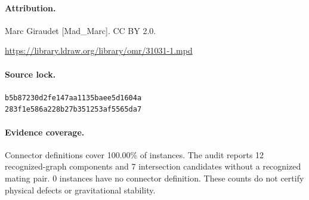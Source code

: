 \paragraph{Attribution.}Marc Giraudet [Mad\_Marc]. CC BY 2.0.\par\noindent\url{https://library.ldraw.org/library/omr/31031-1.mpd}
\paragraph{Source lock.}\small\texttt{b5b87230d2fe147aa1135baee5d1604a}\\\texttt{283f1e586a228b27b351253af5565da7}\normalsize
\paragraph{Evidence coverage.}Connector definitions cover 100.00\% of instances. The audit reports 12 recognized-graph components and 7 intersection candidates without a recognized mating pair. 0 instances have no connector definition. These counts do not certify physical defects or gravitational stability.
